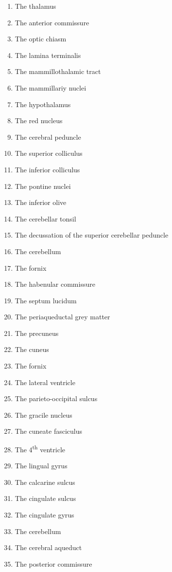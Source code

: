 \documentclass[]{book}
\providecommand{\tightlist}{%
  \setlength{\itemsep}{0pt}\setlength{\parskip}{0pt}}
\begin{document}
\begin{enumerate}
\def\labelenumi{\arabic{enumi}.}
\tightlist
\item
  The thalamus
\item
  The anterior commissure
\item
  The optic chiasm
\item
  The lamina terminalis
\item
  The mammillothalamic tract
\item
  The mammillariy nuclei
\item
  The hypothalamus
\item
  The red nucleus
\item
  The cerebral peduncle
\item
  The superior colliculus
\item
  The inferior colliculus
\item
  The pontine nuclei
\item
  The inferior olive
\item
  The cerebellar tonsil
\item
  The decussation of the superior cerebellar peduncle
\item
  The cerebellum
\item
  The fornix
\item
  The habenular commissure
\item
  The septum lucidum
\item
  The periaqueductal grey matter
\item
  The precuneus
\item
  The cuneus
\item
  The fornix
\item
  The lateral ventricle
\item
  The parieto-occipital sulcus
\item
  The gracile nucleus
\item
  The cuneate fasciculus
\item
  The 4\textsuperscript{th} ventricle
\item
  The lingual gyrus
\item
  The calcarine sulcus
\item
  The cingulate sulcus
\item
  The cingulate gyrus
\item
  The cerebellum
\item
  The cerebral aqueduct
\item
  The posterior commissure
\end{enumerate}
\end{document}
